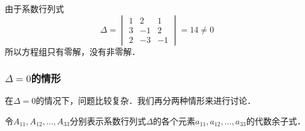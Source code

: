 \begin{solution}
    由于系数行列式
\[\Delta=\begin{vmatrix}
    1&2&1\\3&-1&2\\2&-3&-1
\end{vmatrix}=14\ne 0\]
所以方程组只有零解，没有非零解．
\end{solution}

\subsubsection{$\Delta=0$的情形}
在$\Delta=0$的情况下，问题比较复杂．我们再分两种情形来进行讨论．

令$A_{11},A_{12},\ldots,A_{33}$分别表示系数行列式$\Delta$的各个元素$a_{11},a_{12},\ldots,a_{33}$的代数余子式．

